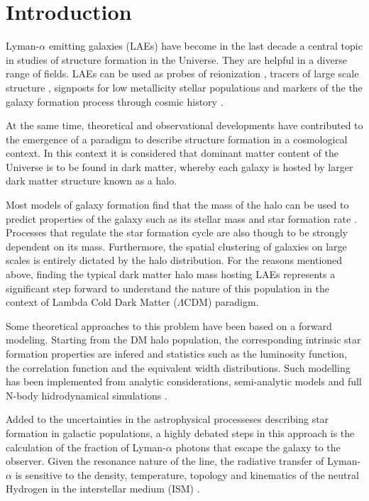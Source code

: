 \documentclass[usenatbib]{mn2e}
\begin{document}
\section{Introduction}

Lyman-$\alpha$ emitting galaxies (LAEs) have become in the last decade a 
central topic in studies of structure formation in the Universe. They 
are helpful in a diverse range of fields. LAEs can
be used as probes of reionization \citep{Dijkstra11}, tracers of
large scale structure \citep{Koehler2007}, 
signposts for low metallicity stellar populations and markers of the
the galaxy formation process through cosmic history \citep{ForeroRomero2012}.  


At the same time, theoretical and observational developments have
contributed to the emergence of a paradigm to describe structure
formation in a cosmological context. In this context it is considered
that dominant matter content of the Universe is to be found in dark
matter, whereby each galaxy is hosted by larger dark matter structure
known as a halo. 

Most models of galaxy formation find that the mass of the halo can be
used to predict properties of the galaxy such as its stellar mass and
star formation rate \citep{Behroozi2012}. Processes that regulate the
star formation cycle are also though to be strongly dependent on its
mass. Furthermore, the spatial clustering of galaxies on large scales
is entirely dictated by the halo distribution.  For the reasons
mentioned above, finding the typical dark matter halo mass hosting
LAEs represents a significant step forward to understand the nature of
this population in the context of Lambda Cold Dark Matter
($\Lambda$CDM) paradigm.  

Some theoretical approaches to this problem have been based on a
forward modeling. Starting from the DM halo population, the
corresponding intrinsic star formation properties are infered and
statistics such as the luminosity function, the correlation function
and the equivalent width distributions. Such modelling has been
implemented from analytic considerations, semi-analytic models
 and 
full N-body hidrodynamical simulations
\citep{Dayal2009, ForeroRomero2011, Yajima2012, ForeroRomero2012} . 

Added to the uncertainties in the astrophysical processeses describing
star formation in galactic populations, a highly debated steps in this
approach is the calculation of the fraction of Lyman-$\alpha$ photons
that escape the galaxy to the observer. Given the resonance nature of
the line, the radiative transfer of Lyman-$\alpha$ is sensitive to the
density, temperature, topology and kinematics of the neutral Hydrogen
in the interstellar medium (ISM) \citep{Neufeld1991, ForeroRomero2011,
Laursen2013}.  
\end{document}

